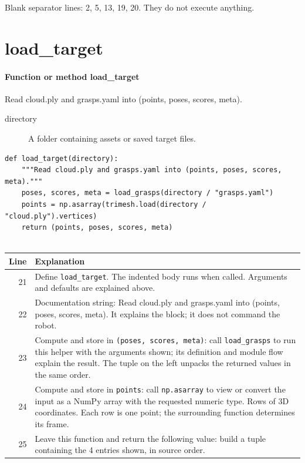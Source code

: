 \documentclass[11pt,a4paper]{book}
\begin{document}
Blank separator lines: 2, 5, 13, 19, 20. They do not execute anything.

\section{load\_target}

\paragraph{Function or method load\_target}
Read cloud.ply and grasps.yaml into (points, poses, scores, meta).

\begin{description}
\item[directory] A folder containing assets or saved target files.
\end{description}

\begin{lstlisting}[firstnumber=21]
def load_target(directory):
    """Read cloud.ply and grasps.yaml into (points, poses, scores, meta)."""
    poses, scores, meta = load_grasps(directory / "grasps.yaml")
    points = np.asarray(trimesh.load(directory / "cloud.ply").vertices)
    return (points, poses, scores, meta)


\end{lstlisting}

\begin{longtable}{r p{}}

\textbf{Line} & \textbf{Explanation} \\ \hline \endhead

21 & Define \texttt{load\_target}. The indented body runs when called. Arguments and defaults are explained above. \\

22 & Documentation string: Read cloud.ply and grasps.yaml into (points, poses, scores, meta). It explains the block; it does not command the robot. \\

23 & Compute and store in \texttt{(poses, scores, meta)}: call \texttt{load\_grasps} to run this helper with the arguments shown; its definition and module flow explain the result. The tuple on the left unpacks the returned values in the same order. \\

24 & Compute and store in \texttt{points}: call \texttt{np.asarray} to view or convert the input as a NumPy array with the requested numeric type. Rows of 3D coordinates. Each row is one point; the surrounding function determines its frame. \\

25 & Leave this function and return the following value: build a tuple containing the 4 entries shown, in source order. \\

\end{longtable}
\end{document}
